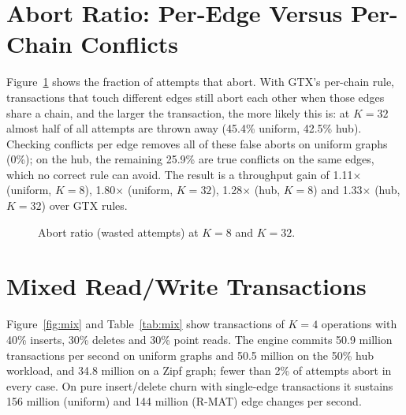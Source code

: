 \documentclass[11pt,a4paper,oneside]{report}
\newcommand{\sys}{GTX-GPU}
\begin{document}
\section{Abort Ratio: Per-Edge Versus Per-Chain Conflicts}
Figure~\ref{fig:aborts} shows the fraction of attempts that abort. With GTX's per-chain rule, transactions that touch
different edges still abort each other when those edges share a chain, and the larger the transaction, the more likely
this is: at $K=32$ almost half of all attempts are thrown away (45.4\% uniform, 42.5\% hub). Checking conflicts per
edge removes all of these false aborts on uniform graphs (0\%); on the hub, the remaining 25.9\% are true conflicts on
the same edges, which no correct rule can avoid. The result is a throughput gain of 1.11$\times$ (uniform, $K=8$),
1.80$\times$ (uniform, $K=32$), 1.28$\times$ (hub, $K=8$) and 1.33$\times$ (hub, $K=32$) over GTX rules.

\begin{figure}[H]
\centering
{}
\caption{Abort ratio (wasted attempts) at $K=8$ and $K=32$.}
\label{fig:aborts}
\end{figure}

\section{Mixed Read/Write Transactions}
Figure~\ref{fig:mix} and Table~\ref{tab:mix} show transactions of $K=4$ operations with 40\% inserts, 30\% deletes and
30\% point reads. The engine commits 50.9 million transactions per second on uniform graphs and 50.5 million on the
50\% hub workload, and 34.8 million on a Zipf graph; fewer than 2\% of attempts abort in every case. On pure
insert/delete churn with single-edge transactions it sustains 156 million (uniform) and 144 million (R-MAT) edge
changes per second.
\end{document}
